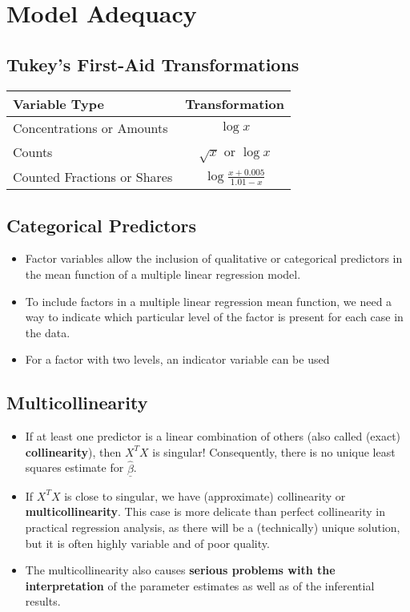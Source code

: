 \section{Model Adequacy}

\subsection{Tukey's First-Aid Transformations}
\begin{tabular}{l c}
Variable Type               & Transformation                \\
\hline
Concentrations or Amounts   & $\log{x}$                     \\
Counts                      & $\sqrt{x}$ or $\log{x}$       \\
Counted Fractions or Shares & $\log \frac{x+0.005}{1.01-x}$ \\
\end{tabular}

\subsection{Categorical Predictors}
\begin{itemize}
\item Factor variables allow the inclusion of qualitative or categorical
predictors in the mean function of a multiple linear regression model.
\item To include factors in a multiple linear regression mean function,
we need a way to indicate which particular level of the factor is present for
each case in the data.
\item For a factor with two levels, an indicator variable can be used
\end{itemize}

\subsection{Multicollinearity}
\begin{itemize}
\item If at least one predictor is a linear combination of others (also called
(exact) \textbf{collinearity}), then $X^T X$ is singular! Consequently, there
is no unique least squares estimate for $\underline{\widehat{\beta}}$.
\item If $X^T X$ is close to singular, we have (approximate) collinearity or
\textbf{multicollinearity}.
This case is more delicate than perfect collinearity in practical regression
analysis, as there will be a (technically) unique solution, but it is often
highly variable and of poor quality.
\item The multicollinearity also causes \textbf{serious problems with the
interpretation} of the parameter estimates as well as of the inferential
results.
\end{itemize}

